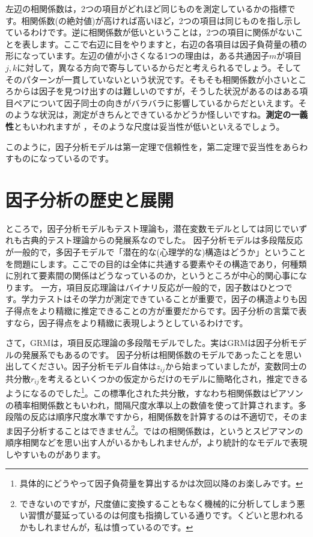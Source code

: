 \documentclass{ltjsbook}
\begin{document}
左辺の相関係数は，2つの項目がどれほど同じものを測定しているかの指標です。相関係数(の絶対値)が高ければ高いほど，2つの項目は同じものを指し示しているわけです。逆に相関係数が低いということは，2つの項目に関係がないことを表します。ここで右辺に目をやりますと，右辺の各項目は因子負荷量の積の形になっています。左辺の値が小さくなる1つの理由は，ある共通因子$m$が項目$j,k$に対して，異なる方向で寄与しているからだと考えられるでしょう。そしてそのパターンが一貫していないという状況です。そもそも相関係数が小さいところからは因子を見つけ出すのは難しいのですが，そうした状況があるのはある項目ペアについて因子同士の向きがバラバラに影響しているからだといえます。そのような状況は，測定がきちんとできているかどうか怪しいですね。\textbf{測定の一義性}ともいわれますが
，そのような尺度は妥当性が低いといえるでしょう。

このように，因子分析モデルは第一定理で信頼性を，第二定理で妥当性をあらわすものになっているのです。


\section{因子分析の歴史と展開}

ところで，因子分析モデルもテスト理論も，潜在変数モデルとしては同じでいずれも古典的テスト理論からの発展系なのでした。
因子分析モデルは多段階反応が一般的で，多因子モデルで「潜在的な(心理学的な)構造はどうか」ということを問題にします。ここでの目的は全体に共通する要素やその構造であり，何種類に別れて要素間の関係はどうなっているのか，というところが中心的関心事になります。
一方，項目反応理論はバイナリ反応が一般的で，因子数はひとつです。学力テストはその学力が測定できていることが重要で，因子の構造よりも因子得点をより精緻に推定できることの方が重要だからです。因子分析の言葉で表すなら，因子得点をより精緻に表現しようとしているわけです。

さて，GRMは，項目反応理論の多段階モデルでした。実はGRMは因子分析モデルの発展系でもあるのです。
因子分析は相関係数のモデルであったことを思い出してください。因子分析モデル自体は$z_{ij}$から始まっていましたが，変数同士の共分散$r_{ij}$を考えるといくつかの仮定からだけのモデルに簡略化され，推定できるようになるのでした\footnote{具体的にどうやって因子負荷量を算出するかは次回以降のお楽しみです。}。この標準化された共分散，すなわち相関係数はピアソンの積率相関係数ともいわれ，間隔尺度水準以上の数値を使って計算されます。多段階の反応は順序尺度水準ですから，相関係数を計算するのは不適切で，そのまま因子分析することはできません\footnote{できないのですが，尺度値に変換することもなく機械的に分析してしまう悪い習慣が蔓延っているのは何度も指摘している通りです。くどいと思われるかもしれませんが，私は憤っているのです。}。ではの相関係数は，というとスピアマンの順序相関などを思い出す人がいるかもしれませんが，より統計的なモデルで表現しやすいものがあります。
\end{document}
